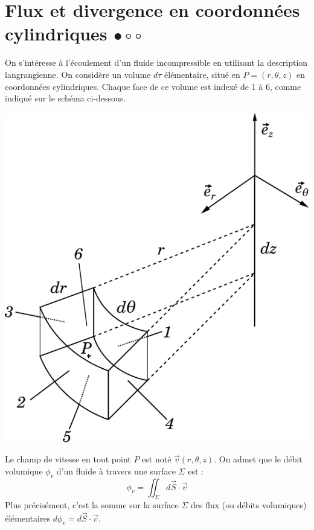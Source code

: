 \documentclass{report}
\begin{document}
\section*{Flux et divergence en coordonnées cylindriques $\bullet\circ\circ$}

On s'intéresse à l'écoulement d'un fluide incompressible en utilisant la description langrangienne. On considère un volume $d\tau$ élémentaire, situé en $P=(r,\theta,z)$ en coordonnées cylindriques. Chaque face de ce volume est indexé de 1 à 6, comme indiqué sur le schéma ci-dessous.

\begin{center}
	\includegraphics[scale=0.65]{div_meca_flu.pdf}
\end{center}

Le champ de vitesse en tout point $P$ est noté $\vec{v}(r,\theta,z)$. On admet que le débit volumique $\phi_v$ d'un fluide à travers une surface $\Sigma$ est :
\begin{equation}
\label{eq:debit}
	\phi_v = \iint _\Sigma d\vec{S}\cdot\vec{v}
\end{equation}
Plus précisément, c'est la somme sur la surface $\Sigma$ des flux (ou débits volumiques) élémentaires $d\phi_v=d\vec{S}\cdot\vec{v}$.
\end{document}
